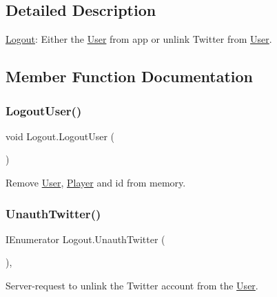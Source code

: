 \subsection{Detailed Description}
\mbox{\hyperlink{class_logout}{Logout}}\+: Either the \mbox{\hyperlink{class_user}{User}} from app or unlink Twitter from \mbox{\hyperlink{class_user}{User}}. 

\subsection{Member Function Documentation}
\mbox{\label{class_logout_ad1bedba9ab92ee90679b995dfcc168cf}} 
\subsubsection{\texorpdfstring{LogoutUser()}{LogoutUser()}}
{\footnotesize\ttfamily void Logout.\+Logout\+User (\begin{DoxyParamCaption}{ }\end{DoxyParamCaption})\hspace{0.3cm}{\ttfamily [inline]}}



Remove \mbox{\hyperlink{class_user}{User}}, \mbox{\hyperlink{class_player}{Player}} and id from memory. 

\mbox{\label{class_logout_acab0eb6e5b954777d300611cb247c117}} 
\subsubsection{\texorpdfstring{UnauthTwitter()}{UnauthTwitter()}}
{\footnotesize\ttfamily I\+Enumerator Logout.\+Unauth\+Twitter (\begin{DoxyParamCaption}{ }\end{DoxyParamCaption})\hspace{0.3cm}{\ttfamily [inline]}, {\ttfamily [private]}}



Server-\/request to unlink the Twitter account from the \mbox{\hyperlink{class_user}{User}}. 

\mbox{\label{class_logout_af1a3466e449f3a3d69ab1063051902c7}} 
